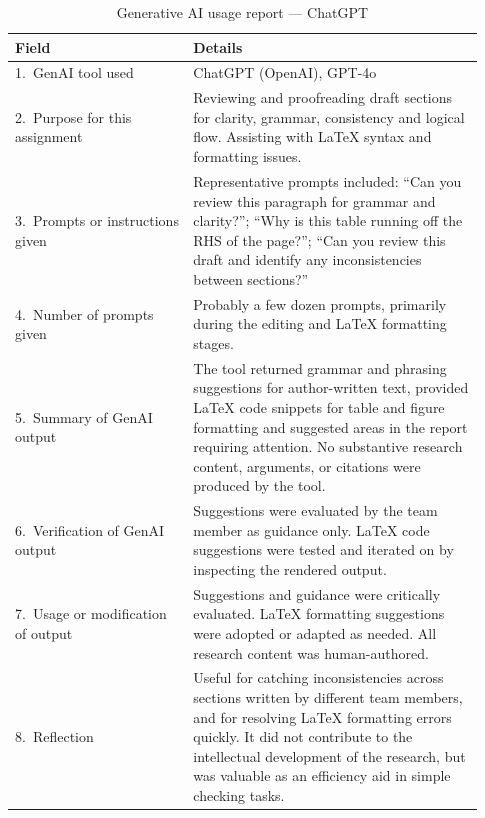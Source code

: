 \begin{table}[H]
\renewcommand{\arraystretch}{1.4}
\begin{tabular}{|p{0.35\linewidth}|p{0.58\linewidth}|}
    \hline
    \textbf{Field} & \textbf{Details} \\
    \hline

    1.\ GenAI tool used
    & ChatGPT (OpenAI), GPT-4o \\
    \hline

    2.\ Purpose for this assignment
    & Reviewing and proofreading draft sections for clarity,
      grammar, consistency and logical flow. Assisting with \LaTeX{} syntax
      and formatting issues. \\
    \hline

    3.\ Prompts or instructions given
    & Representative prompts included: ``Can you review this
      paragraph for grammar and clarity?''; ``Why is this table running off the RHS of the page?''; ``Can you review this draft and identify any inconsistencies between sections?'' \\
    \hline

    4.\ Number of prompts given
    & Probably a few dozen prompts, primarily
      during the editing and \LaTeX{} formatting stages. \\
    \hline

    5.\ Summary of GenAI output
    & The tool returned grammar and phrasing suggestions for
      author-written text, provided \LaTeX{} code snippets
      for table and figure formatting and suggested areas in the report requiring attention. No substantive research
      content, arguments, or citations were produced by the tool. \\
    \hline

    6.\ Verification of GenAI output
    & Suggestions were evaluated by the
      team member as guidance only.
      \LaTeX{} code suggestions were tested and iterated on by inspecting the rendered output.  \\
    \hline

    7.\ Usage or modification of output
    & Suggestions and guidance were critically evaluated. \LaTeX{}
      formatting suggestions were adopted or adapted as needed.
      All research content was human-authored. \\
    \hline

    8.\ Reflection
    & Useful for catching inconsistencies
      across sections written by different team members, and
      for resolving \LaTeX{} formatting errors quickly. It did
      not contribute to the intellectual development of the
      research, but was valuable as an efficiency aid in simple checking tasks. \\
    \hline

\end{tabular}
\caption{Generative AI usage report --- ChatGPT}
\end{table}

